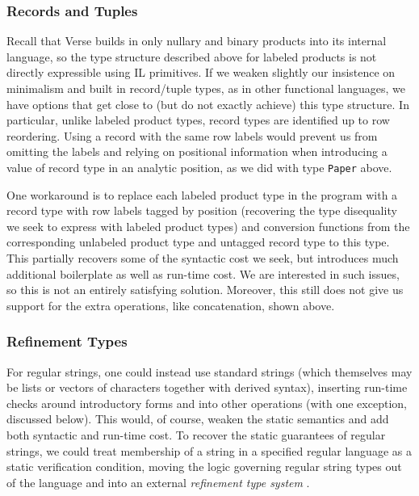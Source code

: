 \subsubsection{Records and Tuples}
Recall that Verse builds in only nullary and binary products into its internal language, so the type structure described above for labeled products  is not directly expressible using IL primitives. If we weaken slightly our insistence on minimalism and built in record/tuple types, as in other functional languages, we have  options that get close to (but do not  exactly achieve) this type structure. In particular, unlike labeled product types, record types are identified up to row reordering. Using a record with the same row labels would prevent us from omitting the labels and relying on positional information when introducing a value of record type in an analytic position, as we did with type \lstinline{Paper} above. %

One workaround is to replace each labeled product type in the program with a record type with row labels tagged by position (recovering the type disequality we seek to express with labeled product types) and conversion functions from the corresponding unlabeled product type and untagged record type to this type. 
This partially recovers some of the syntactic cost we seek, but introduces much additional  boilerplate as well as run-time cost. We are interested in such issues, so this is not an entirely satisfying solution. %
Moreover, this still does not give us support for the extra operations, like concatenation,  shown above.

\subsubsection{Refinement Types}
For regular strings, one could instead use standard strings (which themselves may be lists or vectors of characters together with derived syntax), inserting run-time checks around introductory forms and into other operations (with one exception, discussed below). This would, of course,  weaken the static semantics and add both syntactic and run-time cost. To recover the static guarantees of regular strings, we could treat membership of a string in a specified regular language as a static verification condition, moving the logic governing regular string types out of the language and into an external \emph{refinement type system} \cite{Freeman91}. 

